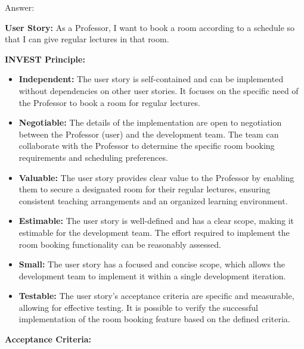 \documentclass[article,onecolumn]{IEEEtran}
\begin{document}
Answer:
\begin{framed}
	\small
	\textbf{User Story:} As a Professor, I want to book a room according to a schedule so that I can give regular lectures in that room.
	
	\textbf{INVEST Principle:}
	
	\begin{itemize}
		\item \textbf{Independent:} The user story is self-contained and can be implemented without dependencies on other user stories. It focuses on the specific need of the Professor to book a room for regular lectures.
		
		\item \textbf{Negotiable:} The details of the implementation are open to negotiation between the Professor (user) and the development team. The team can collaborate with the Professor to determine the specific room booking requirements and scheduling preferences.
		
		\item \textbf{Valuable:} The user story provides clear value to the Professor by enabling them to secure a designated room for their regular lectures, ensuring consistent teaching arrangements and an organized learning environment.
		
		\item \textbf{Estimable:} The user story is well-defined and has a clear scope, making it estimable for the development team. The effort required to implement the room booking functionality can be reasonably assessed.
		
		\item \textbf{Small:} The user story has a focused and concise scope, which allows the development team to implement it within a single development iteration.
		
		\item \textbf{Testable:} The user story's acceptance criteria are specific and measurable, allowing for effective testing. It is possible to verify the successful implementation of the room booking feature based on the defined criteria.
	\end{itemize}
	
	\textbf{Acceptance Criteria:}
	

\end{framed}
\end{document}
